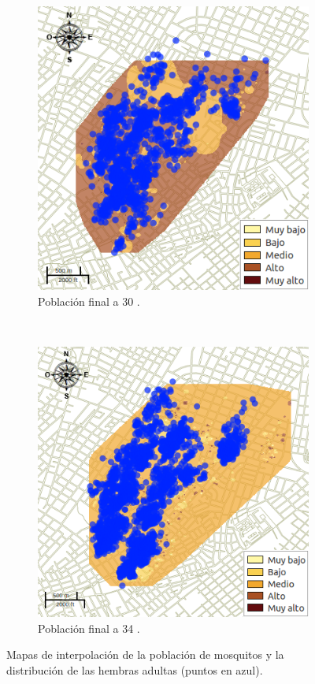 \begin{figure}[!htpb]
    \begin{subfigure}[b]{0.225\textwidth}
        \includegraphics[width=\textwidth]{../book/capitulo-6/graphics/raster/temp-30-35.png}
        \caption{ Población final a 30 \textcelsius.}
    \end{subfigure}
    ~~~~
    \begin{subfigure}[b]{0.225\textwidth}
        \includegraphics[width=\textwidth]{../book/capitulo-6/graphics/raster/temp-34-42.png}
        \caption{ Población final a 34 \textcelsius.}
    \end{subfigure}
\caption{\label{fig:poblacion-mapas-all} Mapas de interpolación de la población de mosquitos y la distribución de las hembras adultas (puntos en azul).}
\end{figure}


